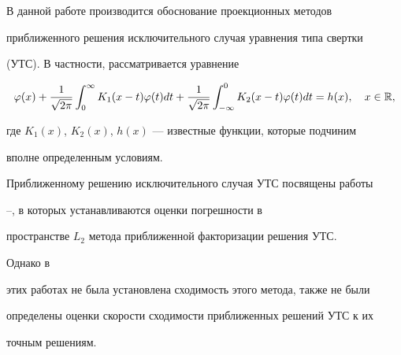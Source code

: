  


\pagestyle{plain} %


 


 




 


\maketitle 


\label{begin} 


 


В данной работе производится обоснование проекционных методов 


приближенного решения исключительного случая уравнения типа свертки 


(УТС). В частности, рассматривается уравнение 


\begin{equation} 


\varphi(x)+\frac{1}{\sqrt{2\pi}}\int^\infty_0 


K_1(x-t)\varphi(t)dt+\frac{1}{\sqrt{2\pi}}\int^0_{-\infty} 


K_2(x-t)\varphi(t)dt=h(x),\quad x\in\Bbb R, 


\end{equation} 


где $K_1(x)$, $K_2(x)$, $h(x)$ --- известные функции, которые подчиним 


вполне определенным условиям. 


 


Приближенному решению исключительного случая УТС посвящены работы 


\cite{1}--\cite{3}, в которых устанавливаются оценки погрешности в 


пространстве $L_2$ метода приближенной факторизации решения УТС. 


Однако в 


этих работах не была установлена сходимость этого метода, также не были 


определены оценки скорости сходимости приближенных решений УТС к их 


точным решениям. 


\medskip 


